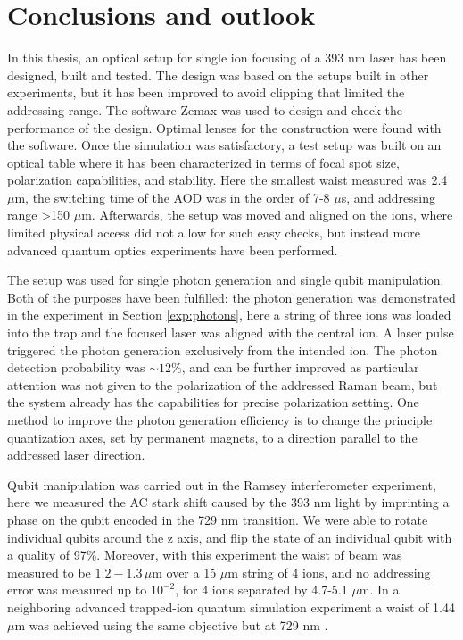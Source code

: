
\chapter{Conclusions and outlook}
In this thesis, an optical setup for single ion focusing of a 393 nm laser has been designed, built and tested. The design was based on the setups built in other experiments, but it has been improved to avoid clipping that limited the addressing range. The software Zemax was used to design and check the performance of the design. Optimal lenses for the construction were found with the software. Once the simulation was satisfactory, a test setup was built on an optical table where it has been characterized in terms of focal spot size, polarization capabilities, and stability. Here the smallest waist measured was 2.4 $\mu$m, the switching time of the AOD was in the order of 7-8 $\mu$s, and addressing range >150 $\mu$m. Afterwards, the setup was moved and aligned on the ions, where limited physical access did not allow for such easy checks, but instead more advanced quantum optics experiments have been performed.\par
The setup was used for single photon generation and single qubit manipulation. Both of the purposes have been fulfilled: the photon generation was demonstrated in the experiment in Section \ref{exp:photons}, here a string of three ions was loaded into the trap and the focused laser was aligned with the central ion. A laser pulse triggered the photon generation exclusively from the intended ion. The photon detection probability was $\sim 12\%$, and can be further improved as particular attention was not given to the polarization of the addressed Raman beam, but the system already has the capabilities for precise polarization setting. One method to improve the photon generation efficiency is to change the principle quantization axes, set by permanent magnets, to a direction parallel to the addressed laser direction. \par
Qubit manipulation was carried out in the Ramsey interferometer experiment, here we measured the AC stark shift caused by the 393 nm light by imprinting a phase on the qubit encoded in the 729 nm transition. We were able to rotate individual qubits around the z axis, and flip the state of an individual qubit with a quality of 97\%. Moreover, with this experiment the waist of beam was measured to be $1.2-1.3\,\mu$m over a 15 $\mu$m string of 4 ions, and no addressing error was measured up to $10^{-2}$, for 4 ions separated by 4.7-5.1 $\mu$m. In a neighboring advanced trapped-ion quantum simulation experiment a waist of 1.44 $\mu$m was achieved using the same objective but at 729 nm \cite{hempel}.\par
